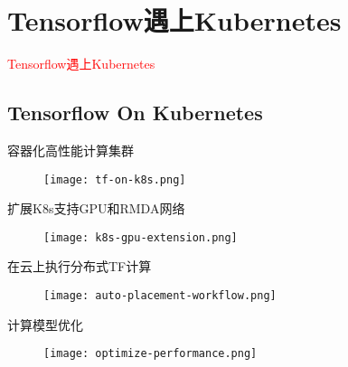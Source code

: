 \section{Tensorflow遇上Kubernetes}
\label{sec:tensorflow-on-kubernetes}

\begin{frame}
  \begin{center}
    \Huge{\textcolor{red}{Tensorflow遇上Kubernetes}}
  \end{center}
\end{frame}

\subsection{Tensorflow On Kubernetes}

\begin{frame}{容器化高性能计算集群}
  \begin{figure}
    \centering
    \texttt{[image: tf-on-k8s.png]}
  \end{figure}
\end{frame}

\begin{frame}{扩展K8s支持GPU和RMDA网络}
  \begin{figure}
    \centering
    \texttt{[image: k8s-gpu-extension.png]}
  \end{figure}
\end{frame}

\begin{frame}{在云上执行分布式TF计算}
  \begin{figure}
    \centering
    \texttt{[image: auto-placement-workflow.png]}
  \end{figure}
\end{frame}

\begin{frame}{计算模型优化}
  \begin{figure}
    \centering
    \texttt{[image: optimize-performance.png]}
  \end{figure}
\end{frame}
